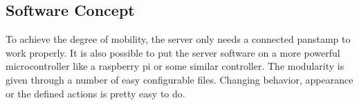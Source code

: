 
\subsection{Software Concept} 

To achieve the degree of mobility, the server only needs a connected panstamp to work properly. It is also possible to put the server software on a more powerful microcontroller like a raspberry pi or some similar controller.
The modularity is given through a number of easy configurable files. Changing behavior, appearance or the defined actions is pretty easy to do.

